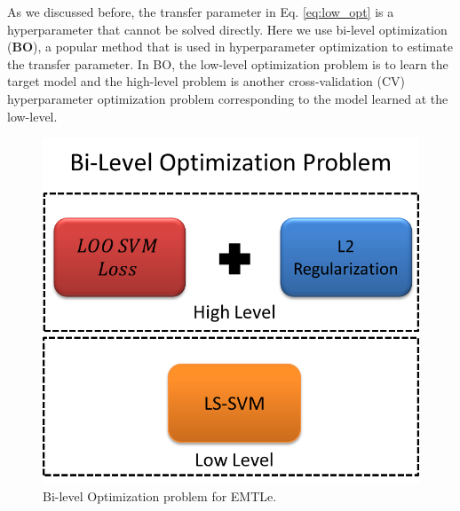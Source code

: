 As we discussed before, the transfer parameter in Eq. \eqref{eq:low_opt} is a hyperparameter that cannot be solved directly. 
Here we use bi-level optimization (\textbf{BO})\cite{Pedregosa16}, a popular method that is used in hyperparameter optimization to estimate the transfer parameter. In BO, the low-level optimization problem is to learn the target model and the high-level problem is another cross-validation (CV) hyperparameter optimization problem corresponding to the model learned at the low-level.

\begin{figure}[h]
	\centering
	\includegraphics[scale=.7]{pakdd/fig/bo.png}
	\caption{Bi-level Optimization problem for EMTLe.}%
	\label{fig:pakdd:bo}
\end{figure}


